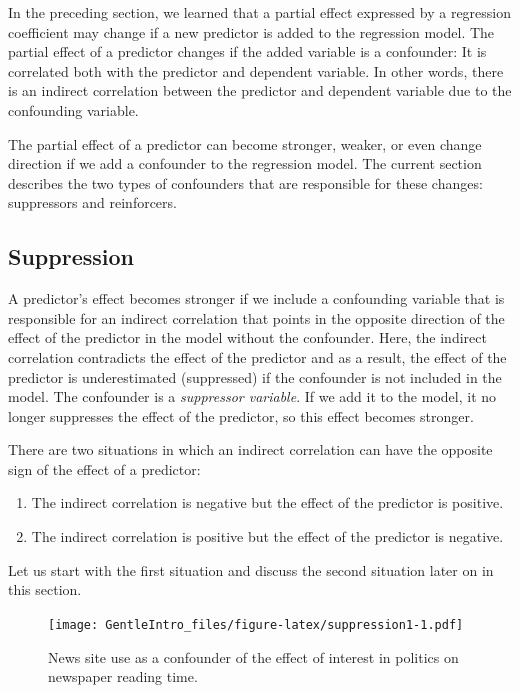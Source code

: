 \documentclass[a4paper]{book}
\theoremstyle{definition}
\theoremstyle{definition}
\theoremstyle{definition}
\theoremstyle{remark}
\begin{document}
In the preceding section, we learned that a partial effect expressed by
a regression coefficient may change if a new predictor is added to the
regression model. The partial effect of a predictor changes if the added
variable is a confounder: It is correlated both with the predictor and
dependent variable. In other words, there is an indirect correlation
between the predictor and dependent variable due to the confounding
variable.

The partial effect of a predictor can become stronger, weaker, or even
change direction if we add a confounder to the regression model. The
current section describes the two types of confounders that are
responsible for these changes: suppressors and reinforcers.

\subsection{Suppression}\label{suppression}

A predictor's effect becomes stronger if we include a confounding
variable that is responsible for an indirect correlation that points in
the opposite direction of the effect of the predictor in the model
without the confounder. Here, the indirect correlation contradicts the
effect of the predictor and as a result, the effect of the predictor is
underestimated (suppressed) if the confounder is not included in the
model. The confounder is a \emph{suppressor variable}. If we add it to
the model, it no longer suppresses the effect of the predictor, so this
effect becomes stronger.

There are two situations in which an indirect correlation can have the
opposite sign of the effect of a predictor:

\begin{enumerate}
\def\labelenumi{\arabic{enumi}.}
\item
  The indirect correlation is negative but the effect of the predictor
  is positive.
\item
  The indirect correlation is positive but the effect of the predictor
  is negative.
\end{enumerate}

Let us start with the first situation and discuss the second situation
later on in this section.

\begin{figure}
\centering
\texttt{[image: GentleIntro\_files/figure-latex/suppression1-1.pdf]}
\caption{\label{fig:suppression1}News site use as a confounder of the effect
of interest in politics on newspaper reading time.}
\end{figure}
\end{document}
